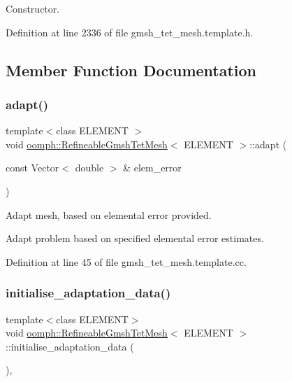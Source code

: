 Constructor. 



Definition at line 2336 of file gmsh\+\_\+tet\+\_\+mesh.\+template.\+h.



\subsection{Member Function Documentation}
\mbox{\label{classoomph_1_1RefineableGmshTetMesh_ad3ee00690d125ab8211f64d5c85dd3b9}} 
\subsubsection{\texorpdfstring{adapt()}{adapt()}}
{\footnotesize\ttfamily template$<$class E\+L\+E\+M\+E\+NT $>$ \\
void \hyperlink{classoomph_1_1RefineableGmshTetMesh}{oomph\+::\+Refineable\+Gmsh\+Tet\+Mesh}$<$ E\+L\+E\+M\+E\+NT $>$\+::adapt (\begin{DoxyParamCaption}\item[{const Vector$<$ double $>$ \&}]{elem\+\_\+error }\end{DoxyParamCaption})}



Adapt mesh, based on elemental error provided. 

Adapt problem based on specified elemental error estimates. 

Definition at line 45 of file gmsh\+\_\+tet\+\_\+mesh.\+template.\+cc.

\mbox{\label{classoomph_1_1RefineableGmshTetMesh_aea1e1c26bb8772231ce5b2b8d915f764}} 
\subsubsection{\texorpdfstring{initialise\+\_\+adaptation\+\_\+data()}{initialise\_adaptation\_data()}}
{\footnotesize\ttfamily template$<$class E\+L\+E\+M\+E\+NT$>$ \\
void \hyperlink{classoomph_1_1RefineableGmshTetMesh}{oomph\+::\+Refineable\+Gmsh\+Tet\+Mesh}$<$ E\+L\+E\+M\+E\+NT $>$\+::initialise\+\_\+adaptation\+\_\+data (\begin{DoxyParamCaption}{ }\end{DoxyParamCaption})\hspace{0.3cm}{\ttfamily [inline]}, {\ttfamily [protected]}}



